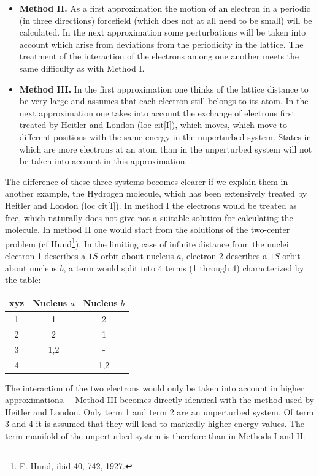 \begin{paper}{1}
\begin{itemize}
\item
\textbf{Method II.}
As a first approximation the motion of an electron in a periodic (in three directions) forcefield (which does not at all need to be small) will be calculated. In the next approximation some perturbations will be taken into account which arise from deviations from the periodicity in the lattice. The treatment of the interaction of the electrons among one another meets the same difficulty as with Method I.

\item
\textbf{Method III.}
In the first approximation one thinks of the lattice distance to be very large and assumes that each electron still belongs to its atom. In the next approximation one takes into account the exchange of electrons first treated by Heitler and London (loc cit\ref{I}), which moves, which move to different positions with the same energy in the unperturbed system. States in which are more electrons at an atom than in the unperturbed system will not be taken into account in this approximation.
\end{itemize}

The difference of these three systems becomes clearer if we explain them in another example, the Hydrogen molecule, which has been extensively treated by Heitler and London (loc cit\ref{I}). In method I the electrons would be treated as free, which naturally does not give not a suitable solution for calculating the molecule. In method II one would start from the solutions of the two-center problem (cf Hund\footnote{F. Hund, ibid 40, 742, 1927.}). In the limiting case of infinite distance from the nuclei electron 1 describes a $1 S$-orbit about nucleus $a$, electron 2 describes a $1 S$-orbit about nucleus $b$, a term would split into 4 terms (1 through 4) characterized by the table:

\begin{tabular}{c||c|c}
\hline\hline
 xyz & Nucleus $a$ & Nucleus $b$ \\
 \hline
 \hline
 1 & 1 & 2\\
 2 & 2 & 1\\
 3 & 1,2 & - \\
 4 & - & 1,2
\end{tabular}

The interaction of the two electrons would only be taken into account in higher approximations. -- Method III becomes directly identical with the method used by Heitler and London. Only term 1 and term 2 are  an unperturbed system. Of term 3 and 4 it is assumed that they will lead to markedly higher energy values. The term manifold of the unperturbed system is therefore  than in Methods I and II.


\end{paper}
